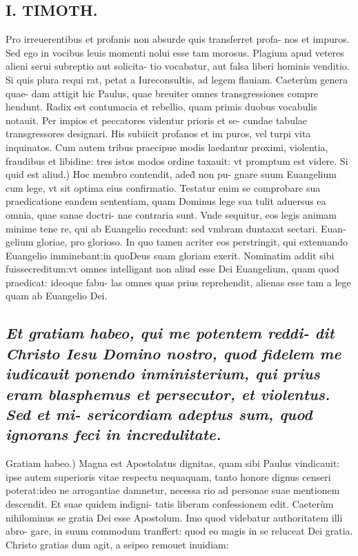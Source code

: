\documentclass{article}
\begin{document}
\begin{pages}
\section*{I. TIMOTH. }
\marginpar{[ p.8 ]}\pstart Pro irreuerentibus et profanis non absurde quis transferret profa- nos et impuros. Sed ego in vocibus leuis momenti nolui esse tam morosus. Plagium apud veteres alieni serui subreptio aut solicita- tio vocabatur, aut falsa liberi hominis venditio. Si quis plura requi rat, petat a Iureconsultis, ad legem flauiam. Caeterùm genera quae- dam attigit hic Paulus, quae breuiter omnes transgressiones compre hendunt. Radix est contumacia et rebellio, quam primis duobus vocabulis notauit. Per impios et peccatores videntur prioris et se- cundae tabulae transgressores designari. His subiicit profanos et im puros, vel turpi vita inquinatos. Cum autem tribus praecipue modis laedantur proximi, violentia, fraudibus et libidine: tres istos modos ordine taxauit: vt promptum est videre.  \pend\pstart Si quid est aliud.) Hoc membro contendit, aded̀ non pu- gnare suum Euangelium cum lege, vt sit optima eius confirmatio. Testatur enim se comprobare sua praedicatione eandem sententiam, quam Dominus lege sua tulit aduersus ea omnia, quae sanae doctri- nae contraria sunt. Vnde sequitur, eos legis animam minime tene re, qui ab Euangelio recedunt: sed vmbram duntaxat sectari. Euan- gelium gloriae, pro glorioso. In quo tamen acriter eos perstringit, qui extenuando Euangelio imminebant:in quoDeus suam gloriam exerit. Nominatim addit sibi fuissecreditum:vt omnes intelligant non aliud esse Dei Euangelium, quam quod praedicat: ideoque fabu- las omnes quas prius reprehendit, alienas esse tam a lege quam ab Euangelio Dei.  \pend
{}
{}
\subsection*{\textit{Et gratiam habeo, qui me potentem reddi- dit Christo Iesu Domino nostro, quod fidelem me iudicauit ponendo inministerium, qui prius eram blasphemus et persecutor, et violentus. Sed et mi- sericordiam adeptus sum, quod ignorans feci in incredulitate. }}\pstart Gratiam habeo.) Magna est Apostolatus dignitas, quam sibi Paulus vindicauit: ipse autem superioris vitae respectu nequaquam, tanto honore dignus censeri poterat:ideo ne arrogantiae damnetur, necessa rio ad personae suae mentionem descendit. Et suae quidem indigni- tatis liberam confessionem edit. Caeterùm nihilominus se gratia Dei esse Apostolum. Imo quod videbatur authoritatem illi abro- gare, in suum commodum tranffert: quod eo magis in se reluceat Dei gratia. Christo gratias dum agit, a seipso remouet inuidiam:  \pend

\end{pages}
\end{document}
